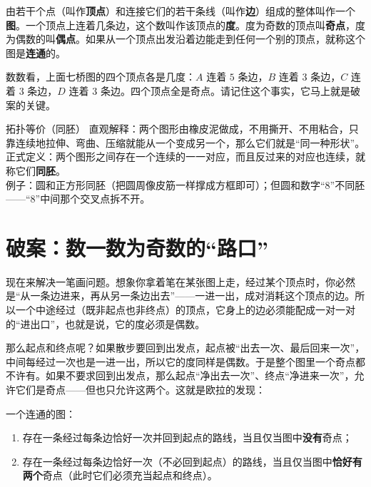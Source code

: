 \begin{dingyi}[图、顶点、边、度]
由若干个点（叫作\textbf{顶点}）和连接它们的若干条线（叫作\textbf{边}）组成的整体叫作一个\textbf{图}。一个顶点上连着几条边，这个数叫作该顶点的\textbf{度}。度为奇数的顶点叫\textbf{奇点}，度为偶数的叫\textbf{偶点}。如果从一个顶点出发沿着边能走到任何一个别的顶点，就称这个图是\textbf{连通}的。
\end{dingyi}

数数看，上面七桥图的四个顶点各是几度：$A$ 连着 $5$ 条边，$B$ 连着 $3$ 条边，$C$ 连着 $3$ 条边，$D$ 连着 $3$ 条边。四个顶点全是奇点。请记住这个事实，它马上就是破案的关键。

\begin{shuyu}{拓扑等价（同胚）}
直观解释：两个图形由橡皮泥做成，不用撕开、不用粘合，只靠连续地拉伸、弯曲、压缩就能从一个变成另一个，那么它们就是“同一种形状”。\\
正式定义：两个图形之间存在一个连续的一一对应，而且反过来的对应也连续，就称它们\textbf{同胚}。\\
例子：圆和正方形同胚（把圆周像皮筋一样撑成方框即可）；但圆和数字“8”不同胚——“8”中间那个交叉点拆不开。
\end{shuyu}

\section{破案：数一数为奇数的“路口”}

现在来解决一笔画问题。想象你拿着笔在某张图上走，经过某个顶点时，你必然是“从一条边进来，再从另一条边出去”——一进一出，成对消耗这个顶点的边。所以一个中途经过（既非起点也非终点）的顶点，它身上的边必须能配成一对一对的“进出口”，也就是说，它的度必须是偶数。

那么起点和终点呢？如果散步要回到出发点，起点被“出去一次、最后回来一次”，中间每经过一次也是一进一出，所以它的度同样是偶数。于是整个图里一个奇点都不许有。如果不要求回到出发点，那么起点“净出去一次”、终点“净进来一次”，允许它们是奇点——但也只允许这两个。这就是欧拉的发现：

\begin{dingli}[欧拉一笔画定理，1736]
一个连通的图：
\begin{enumerate}
  \item 存在一条经过每条边恰好一次并回到起点的路线，当且仅当图中\textbf{没有}奇点；
  \item 存在一条经过每条边恰好一次（不必回到起点）的路线，当且仅当图中\textbf{恰好有两个}奇点（此时它们必须充当起点和终点）。
\end{enumerate}
\end{dingli}

